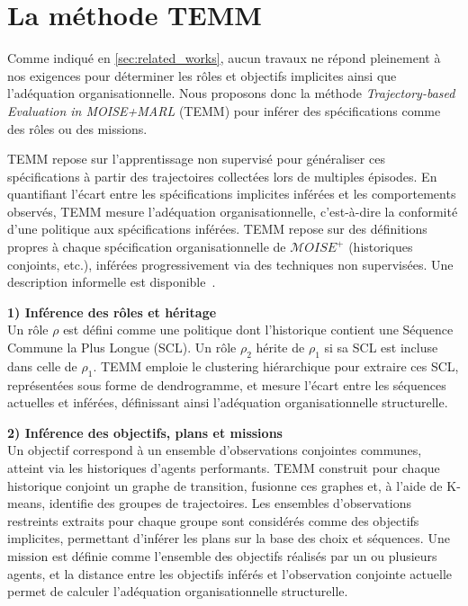 \documentclass[dissemination]{jfsma}
\begin{document}
\section{La méthode TEMM}
\label{sec:TEMM_algorithm}

Comme indiqué en \autoref{sec:related_works}, aucun travaux ne répond pleinement à nos exigences pour déterminer les rôles et objectifs implicites ainsi que l'adéquation organisationnelle. Nous proposons donc la méthode \textit{Trajectory-based Evaluation in MOISE+MARL} (TEMM) pour inférer des spécifications comme des rôles ou des missions.

TEMM repose sur l'apprentissage non supervisé pour généraliser ces spécifications à partir des trajectoires collectées lors de multiples épisodes. En quantifiant l'écart entre les spécifications implicites inférées et les comportements observés, TEMM mesure l'adéquation organisationnelle, c'est-à-dire la conformité d'une politique aux spécifications inférées. TEMM repose sur des définitions propres à chaque spécification organisationnelle de \(\mathcal{M}OISE^+\) (historiques conjoints, etc.), inférées progressivement via des techniques non supervisées. Une description informelle est disponible~\hyperref[fn:github]{\footnotemark[2]}.


\noindent\textbf{1) Inférence des rôles et héritage} \\
Un rôle \(\rho\) est défini comme une politique dont l'historique contient une Séquence Commune la Plus Longue (SCL). Un rôle \(\rho_2\) hérite de \(\rho_1\) si sa SCL est incluse dans celle de \(\rho_1\). TEMM emploie le clustering hiérarchique pour extraire ces SCL, représentées sous forme de dendrogramme, et mesure l'écart entre les séquences actuelles et inférées, définissant ainsi l'adéquation organisationnelle structurelle.

\noindent\textbf{2) Inférence des objectifs, plans et missions} \\
Un objectif correspond à un ensemble d'observations conjointes communes, atteint via les historiques d'agents performants. TEMM construit pour chaque historique conjoint un graphe de transition, fusionne ces graphes et, à l'aide de K-means, identifie des groupes de trajectoires. Les ensembles d'observations restreints extraits pour chaque groupe sont considérés comme des objectifs implicites, permettant d'inférer les plans sur la base des choix et séquences. Une mission est définie comme l'ensemble des objectifs réalisés par un ou plusieurs agents, et la distance entre les objectifs inférés et l'observation conjointe actuelle permet de calculer l'adéquation organisationnelle structurelle.
\end{document}

